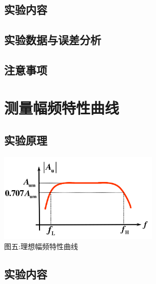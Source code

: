 \documentclass[a4paper]{article}
\begin{document}
    \subsection{实验内容}\label{subsec:10}

    \subsection{实验数据与误差分析}\label{subsec:11}

    \subsection{注意事项}\label{subsec:12}


    \section{测量幅频特性曲线}\label{sec:6}

    \subsection{实验原理}\label{subsec:13}
    \begin{center}
        \includegraphics[height=120pt]{Af}\\
        {\small 图五:理想幅频特性曲线}
    \end{center}

    \subsection{实验内容}\label{subsec:14}
\end{document}
